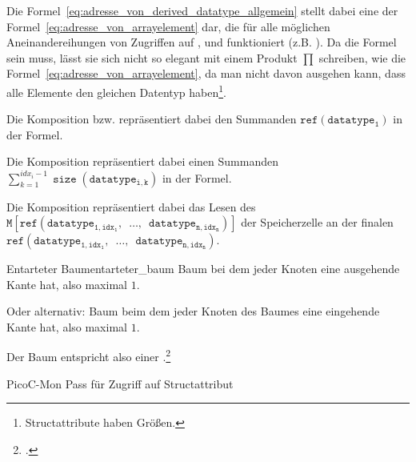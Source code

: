 \begin{Special_Paragraph}
  Die Formel~\ref{eq:adresse_von_derived_datatype_allgemein} stellt dabei eine  der Formel~\ref{eq:adresse_von_arrayelement} dar, die für alle möglichen Aneinandereihungen von Zugriffen auf ,  und  funktioniert (z.B. ). Da die Formel  sein muss, lässt sie sich nicht so elegant mit einem Produkt $\prod$ schreiben, wie die Formel~\ref{eq:adresse_von_arrayelement}, da man nicht davon ausgehen kann, dass alle Elemente den gleichen Datentyp haben\footnote{Structattribute haben  Größen.}.

  Die Komposition  bzw.  repräsentiert dabei den Summanden $\mathtt{ref(datatype_1)}$ in der Formel.

  Die Komposition  repräsentiert dabei einen Summanden $\sum_{k=1}^{idx_i - 1} \mathtt{\operatorname{size}(datatype_{i, k})}$ in der Formel.

Die Komposition  repräsentiert dabei das Lesen des  $\mathtt{M\left[ref(datatype_{1, idx_1},\enspace\ldots,\enspace datatype_{n, idx_n})\right]}$ der Speicherzelle an der finalen  $\mathtt{ref(datatype_{1, idx_1},\enspace\ldots,\enspace datatype_{n, idx_n})}$.
\end{Special_Paragraph}

\begin{Definition}{Entarteter Baum}{entarteter_baum}
  Baum bei dem jeder Knoten  eine ausgehende Kante hat, also maximal  $1$.

  \textnormal{Oder alternativ:} Baum beim dem jeder Knoten des Baumes  eine eingehende Kante hat, also maximal  $1$.

  Der Baum entspricht also einer .\footcite{noauthor_baume_nodate}
\end{Definition}


\begin{code}
  \centering
  \caption{PicoC-Mon Pass für Zugriff auf Structattribut}
  \label{code:picoc_mon_pass_für_zugriff_auf_structattribut}
\end{code}

